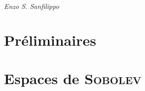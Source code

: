 \documentclass{book}
\begin{document}
	\begin{titlepage}
		\vspace*{9em}{\centering\Huge Théorie de la distribution\par}
        \vspace{2em}
        {\hfill\itshape Enzo S. Sanfilippo}

        \clearpage
	    \vspace*{\fill}
	\end{titlepage}

	\newpage

    {
		\hypersetup{linkcolor=magenta}
		\tableofcontents
	}

    \newpage

    \chapter{Préliminaires}{
        \newpage

        
    }

	\chapter{Espaces de \textsc{Sobolev}}{
		\newpage

		
	}
\end{document}
